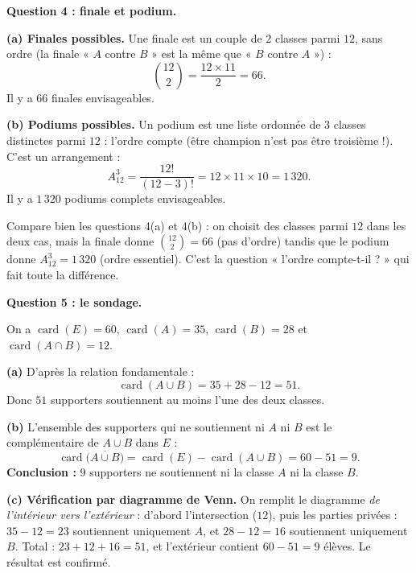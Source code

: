 \documentclass[11pt]{article}
\begin{document}
\begin{exoresolu}
\medskip
\textbf{Question 4 : finale et podium.}

\textbf{(a) Finales possibles.} Une finale est un couple de $2$ classes parmi $12$, sans ordre (la finale « $A$ contre $B$ » est la même que « $B$ contre $A$ ») :
\[ \binom{12}{2} = \frac{12 \times 11}{2} = 66. \]
Il y a $66$ finales envisageables.

\textbf{(b) Podiums possibles.} Un podium est une liste ordonnée de $3$ classes distinctes parmi $12$ : l'ordre compte (être champion n'est pas être troisième !). C'est un arrangement :
\[ A_{12}^{3} = \frac{12!}{(12-3)!} = 12 \times 11 \times 10 = 1\,320. \]
Il y a $1\,320$ podiums complets envisageables.

\begin{attention}
Compare bien les questions 4(a) et 4(b) : on choisit des classes parmi $12$ dans les deux cas, mais la finale donne $\binom{12}{2} = 66$ (pas d'ordre) tandis que le podium donne $A_{12}^{3} = 1\,320$ (ordre essentiel). C'est la question « l'ordre compte-t-il ? » qui fait toute la différence.
\end{attention}

\medskip
\textbf{Question 5 : le sondage.}

On a $\operatorname{card}(E) = 60$, $\operatorname{card}(A) = 35$, $\operatorname{card}(B) = 28$ et $\operatorname{card}(A \cap B) = 12$.

\textbf{(a)} D'après la relation fondamentale :
\[ \operatorname{card}(A \cup B) = 35 + 28 - 12 = 51. \]
Donc $51$ supporters soutiennent au moins l'une des deux classes.

\textbf{(b)} L'ensemble des supporters qui ne soutiennent ni $A$ ni $B$ est le complémentaire de $A \cup B$ dans $E$ :
\[ \operatorname{card}\bigl(\overline{A \cup B}\bigr) = \operatorname{card}(E) - \operatorname{card}(A \cup B) = 60 - 51 = 9. \]
\textbf{Conclusion :} $9$ supporters ne soutiennent ni la classe $A$ ni la classe $B$.

\textbf{(c) Vérification par diagramme de Venn.} On remplit le diagramme \emph{de l'intérieur vers l'extérieur} : d'abord l'intersection ($12$), puis les parties privées : $35 - 12 = 23$ soutiennent uniquement $A$, et $28 - 12 = 16$ soutiennent uniquement $B$. Total : $23 + 12 + 16 = 51$, et l'extérieur contient $60 - 51 = 9$ élèves. Le résultat est confirmé.


\end{exoresolu}
\end{document}
